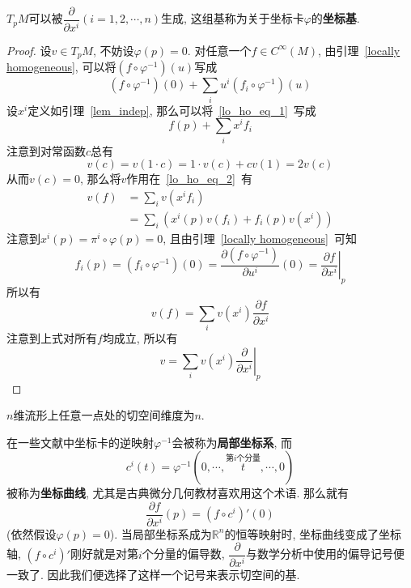 \begin{prop}
    $T_pM$可以被$\dfrac{\partial}{\partial x^i}(i=1,2,\cdots,n)$生成, 这组基称为关于坐标卡$\varphi$的\textbf{坐标基}.
\end{prop}
\begin{proof}
    设$v\in T_pM$, 不妨设$\varphi(p)=0$.
    对任意一个$f\in C^\infty(M)$, 由引理~\ref{locally homogeneous}, 可以将$(f\circ\varphi^{-1})(u)$写成
    \begin{equation}
        (f\circ\varphi^{-1})(0)+\sum_iu^i(f_i\circ\varphi^{-1})(u)\label{lo_ho_eq_1}
    \end{equation}
    设$x^i$定义如引理~\ref{lem_indep}, 那么可以将~\eqref{lo_ho_eq_1}~写成
    \begin{equation}
        f(p)+\sum_ix^if_i\label{lo_ho_eq_2}
    \end{equation}
    注意到对常函数$c$总有
    \[v(c)=v(1\cdot c)=1\cdot v(c)+cv(1)=2v(c)\]
    从而$v(c)=0$, 那么将$v$作用在~\eqref{lo_ho_eq_2}~有
    \begin{align*}
        v(f)&=\sum_iv\left(x^if_i\right)\\
        &=\sum_i\left(x^i(p)v(f_i)+f_i(p)v(x^i)\right)
    \end{align*}
    注意到$x^i(p)=\pi^i\circ\varphi(p)=0$, 且由引理~\ref{locally homogeneous}~可知
    \[f_i(p)=(f_i\circ\varphi^{-1})(0)=\dfrac{\partial(f\circ\varphi^{-1})}{\partial u^i}(0)=\left.\dfrac{\partial f}{\partial x^i}\right|_p\]
    所以有
    \[v(f)=\sum_iv(x^i)\frac{\partial f}{\partial x^i}\]
    注意到上式对所有$f$均成立, 所以有
    \begin{equation}
        v=\sum_iv(x^i)\left.\frac{\partial}{\partial x^i}\right|_p\label{tangent vector}
    \end{equation}
\end{proof}

\begin{col}
    $n$维流形上任意一点处的切空间维度为$n$.
\end{col}

\begin{rem}
    在一些文献中坐标卡的逆映射$\varphi^{-1}$会被称为\textbf{局部坐标系}, 而
    \[c^i(t)=\varphi^{-1}(0,\cdots,\stackrel{{\text{第}i\text{个分量}}}{t},\cdots,0)\]
    被称为\textbf{坐标曲线}, 尤其是古典微分几何教材喜欢用这个术语.
    那么就有
    \[\dfrac{\partial f}{\partial x^i}(p)=(f\circ c^i)'(0)\]
    (依然假设$\varphi(p)=0$).
    当局部坐标系成为$\mathbb{R}^n$的恒等映射时, 坐标曲线变成了坐标轴, $(f\circ c^i)'$刚好就是对第$i$个分量的偏导数, $\dfrac{\partial}{\partial x^i}$与数学分析中使用的偏导记号便一致了.
    因此我们便选择了这样一个记号来表示切空间的基.
\end{rem}

